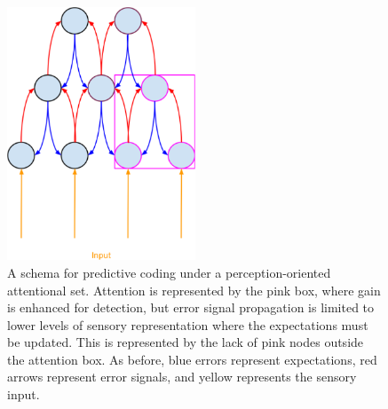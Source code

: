 \begin{figure}[!ht]
\caption{A schema for predictive coding under a perception-oriented attentional set.  Attention is represented by the pink box, where gain is enhanced for detection, but error signal propagation is limited to lower levels of sensory representation where the expectations must be updated.  This is represented by the lack of pink nodes outside the attention box.  As before, blue errors represent expectations, red arrows represent error signals, and yellow represents the sensory input.}
\label{fig:predictivecodingperception}
\begin{center}
\includegraphics[width=0.5\textwidth]{pictures/perception_predictive_coding}
\end{center}
\end{figure}

